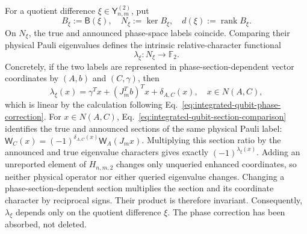 \documentclass[11pt]{article}
\newcommand{\F}{\mathbb F}
\newcommand{\rank}{\operatorname{rank}}
\newcommand{\1}{\mathbf 1}
\theoremstyle{plain}
\theoremstyle{definition}
\theoremstyle{remark}
\begin{document}
For a quotient difference $\xi\in\mathsf Y_{n,m}^{(2)}$, put
\begin{equation}
 B_\xi:=\mathsf B(\xi),
 \quad N_\xi:=\ker B_\xi,
 \quad d(\xi):=\rank B_\xi.
 \label{eq:binary-graded-difference-rank}
\end{equation}
On $N_\xi$, the true and announced phase-space labels coincide.  Comparing
their physical Pauli eigenvalues defines the intrinsic relative-character
functional
\begin{equation}
 \lambda_\xi:N_\xi\longrightarrow\F_2.
 \label{eq:binary-enhanced-relative-character}
\end{equation}
Concretely, if the two labels are represented in phase-section-dependent vector
coordinates by $(A,b)$ and $(C,\gamma)$, then
\begin{equation}
 \lambda_\xi(x)
 =\gamma^Tx+(J_m^Tb)^Tx+\delta_{A,C}(x),
 \quad x\in N(A,C),
 \label{eq:binary-relative-character-vector-realization}
\end{equation}
which is linear by the calculation following
Eq.~\eqref{eq:integrated-qubit-phase-correction}.  For $x\in N(A,C)$, Eq.~\eqref{eq:integrated-qubit-section-comparison}
identifies the true and announced sections of the same physical Pauli label:
$\mathsf W_C(x)=(-1)^{\delta_{A,C}(x)}\mathsf W_A(J_mx)$.
Multiplying this section ratio by the announced and true eigenvalue characters
gives exactly $(-1)^{\lambda_\xi(x)}$.  Adding an unreported element of
$H_{n,m,2}$ changes only unqueried enhanced coordinates, so neither physical
operator nor either queried eigenvalue changes.  Changing a phase-section-dependent section multiplies the section and its
coordinate character by reciprocal signs.  Their product is therefore invariant.  Consequently, $\lambda_\xi$ depends
only on the quotient difference $\xi$.  The phase correction has been
absorbed, not deleted.
\end{document}
